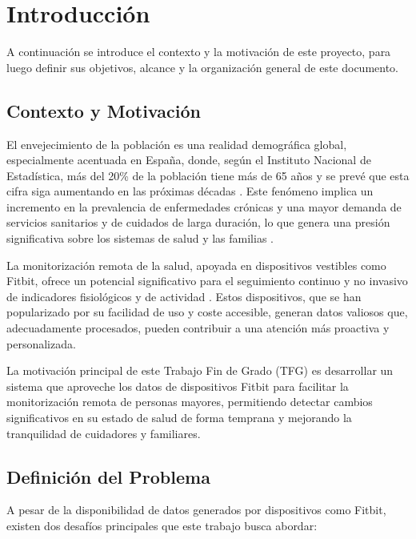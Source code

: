 \chapter{Introducción}
\label{chap:introduccion}
A continuación se introduce el contexto y la motivación de este proyecto, para luego definir sus objetivos, alcance y la organización general de este documento.

\section{Contexto y Motivación}
\label{sec:intro_contexto}

El envejecimiento de la población es una realidad demográfica global, especialmente acentuada en España, donde, según el Instituto Nacional de Estadística, más del 20\% de la población tiene más de 65 años y se prevé que esta cifra siga aumentando en las próximas décadas \cite{ine_proyeccion_2022_2072}. Este fenómeno implica un incremento en la prevalencia de enfermedades crónicas y una mayor demanda de servicios sanitarios y de cuidados de larga duración, lo que genera una presión significativa sobre los sistemas de salud y las familias \cite{who_ageing_health}.

La monitorización remota de la salud, apoyada en dispositivos vestibles como Fitbit\textsuperscript{\textregistered}, ofrece un potencial significativo para el seguimiento continuo y no invasivo de indicadores fisiológicos y de actividad \cite{majumder2017wearable}. Estos dispositivos, que se han popularizado por su facilidad de uso y coste accesible, generan datos valiosos que, adecuadamente procesados, pueden contribuir a una atención más proactiva y personalizada.

La motivación principal de este Trabajo Fin de Grado (TFG) es desarrollar un sistema que aproveche los datos de dispositivos Fitbit\textsuperscript{\textregistered} para facilitar la monitorización remota de personas mayores, permitiendo detectar cambios significativos en su estado de salud de forma temprana y mejorando la tranquilidad de cuidadores y familiares.

\section{Definición del Problema}
\label{sec:intro_problema}

A pesar de la disponibilidad de datos generados por dispositivos como Fitbit\textsuperscript{\textregistered}, existen dos desafíos principales que este trabajo busca abordar:

